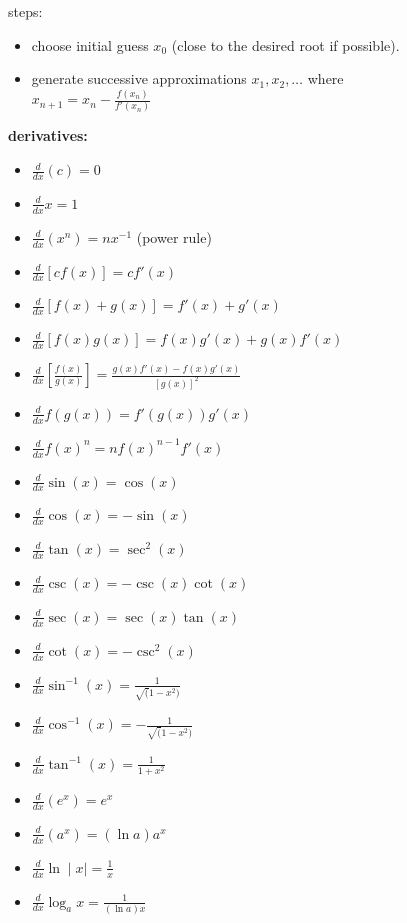 \documentclass{article}
\begin{document}
steps:
	\begin{itemize}
		\item choose initial guess $x_0$ (close to the desired root if possible).
		\item generate successive approximations $x_1, x_2, \ldots$ where\\ $x_{n + 1} = x_n - \frac{f(x_n)}{f'(x_n)}$
	\end{itemize}

\textbf{derivatives:}
	\begin{itemize}
		\item $\frac{d}{dx}(c) = 0$
		\item $\frac{d}{dx}x = 1$
		\item $\frac{d}{dx}(x^n) = nx^{-1}$ (power rule)
		\item $\frac{d}{dx}[cf(x)] = cf'(x)$
		\item $\frac{d}{dx}[f(x)+g(x)] = f'(x) + g'(x)$
		\item $\frac{d}{dx}[f(x)g(x)] = f(x)g'(x) + g(x)f'(x)$
		\item $\frac{d}{dx}[\frac{f(x)}{g(x)}] = \frac{g(x)f'(x) - f(x)g'(x)}{[g(x)]^2}$
		\item $\frac{d}{dx}f(g(x)) = f'(g(x))g'(x)$
		\item $\frac{d}{dx}f(x)^n = nf(x)^{n-1}f'(x)$
		\item $\frac{d}{dx}\sin(x) = \cos(x)$
		\item $\frac{d}{dx}\cos(x) = -\sin(x)$
		\item $\frac{d}{dx}\tan(x) = \sec^2(x)$
		\item $\frac{d}{dx}\csc(x) = -\csc(x)\cot(x)$
		\item $\frac{d}{dx}\sec(x) = \sec(x)\tan(x)$
		\item $\frac{d}{dx}\cot(x) = -\csc^2(x)$
		\item $\frac{d}{dx}\sin^{-1}(x) = \frac{1}{\sqrt(1 - x^2)}$
		\item $\frac{d}{dx}\cos^{-1}(x) = -\frac{1}{\sqrt(1 - x^2)}$
		\item $\frac{d}{dx}\tan^{-1}(x) = \frac{1}{1 + x^2}$
		\item $\frac{d}{dx}(e^x) = e^x$
		\item $\frac{d}{dx}(a^x) = (\ln a)a^x$
		\item $\frac{d}{dx}\ln\mid x\mid = \frac{1}{x}$
		\item $\frac{d}{dx}\log_ax = \frac{1}{(\ln a)x}$
	\end{itemize}
\end{document}

